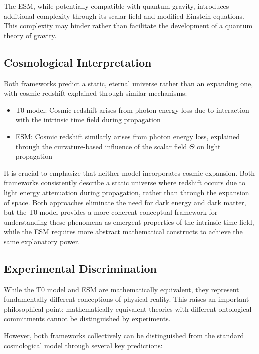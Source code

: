 \documentclass[12pt,a4paper]{article}
\begin{document}
	The ESM, while potentially compatible with quantum gravity, introduces additional complexity through its scalar field and modified Einstein equations. This complexity may hinder rather than facilitate the development of a quantum theory of gravity.
	
	\subsection{Cosmological Interpretation}
	\label{subsec:cosmological_interpretation}
	
	Both frameworks predict a static, eternal universe rather than an expanding one, with cosmic redshift explained through similar mechanisms:
	
	\begin{itemize}
		\item T0 model: Cosmic redshift arises from photon energy loss due to interaction with the intrinsic time field during propagation
		\item ESM: Cosmic redshift similarly arises from photon energy loss, explained through the curvature-based influence of the scalar field \(\Theta\) on light propagation
	\end{itemize}
	
	It is crucial to emphasize that neither model incorporates cosmic expansion. Both frameworks consistently describe a static universe where redshift occurs due to light energy attenuation during propagation, rather than through the expansion of space. Both approaches eliminate the need for dark energy and dark matter, but the T0 model provides a more coherent conceptual framework for understanding these phenomena as emergent properties of the intrinsic time field, while the ESM requires more abstract mathematical constructs to achieve the same explanatory power.
	
	\subsection{Experimental Discrimination}
	\label{subsec:experimental_discrimination}
	
	While the T0 model and ESM are mathematically equivalent, they represent fundamentally different conceptions of physical reality. This raises an important philosophical point: mathematically equivalent theories with different ontological commitments cannot be distinguished by experiments.
	
	However, both frameworks collectively can be distinguished from the standard cosmological model through several key predictions:
	
\end{document}
